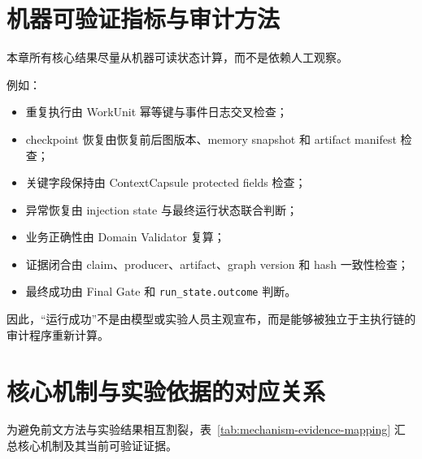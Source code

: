 \documentclass[UTF8,a4paper,12pt,oneside]{ctexbook}
\begin{document}
\section{机器可验证指标与审计方法}

本章所有核心结果尽量从机器可读状态计算，而不是依赖人工观察。

例如：

\begin{itemize}
    \item 重复执行由 WorkUnit 幂等键与事件日志交叉检查；
    \item checkpoint 恢复由恢复前后图版本、memory snapshot 和 artifact manifest 检查；
    \item 关键字段保持由 ContextCapsule protected fields 检查；
    \item 异常恢复由 injection state 与最终运行状态联合判断；
    \item 业务正确性由 Domain Validator 复算；
    \item 证据闭合由 claim、producer、artifact、graph version 和 hash 一致性检查；
    \item 最终成功由 Final Gate 和 \texttt{run\_state.outcome} 判断。
\end{itemize}

因此，“运行成功”不是由模型或实验人员主观宣布，而是能够被独立于主执行链的审计程序重新计算。


\section{核心机制与实验依据的对应关系}

为避免前文方法与实验结果相互割裂，表~\ref{tab:mechanism-evidence-mapping} 汇总核心机制及其当前可验证证据。
\end{document}

